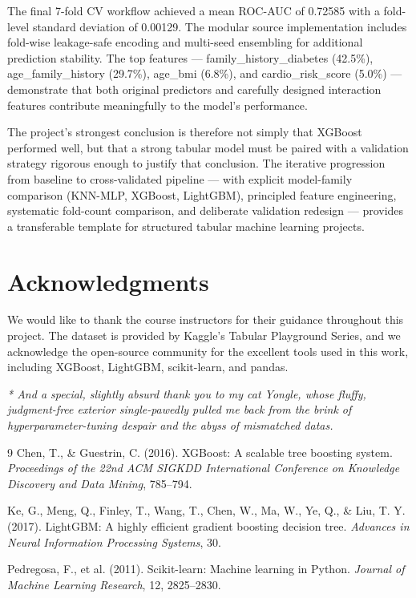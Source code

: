 \documentclass[a4paper,11pt]{article}
\begin{document}
The final 7-fold CV workflow achieved a mean ROC-AUC of 0.72585 with a fold-level standard deviation of 0.00129. The modular source implementation includes fold-wise leakage-safe encoding and multi-seed ensembling for additional prediction stability. The top features --- family\_history\_diabetes (42.5\%), age\_family\_history (29.7\%), age\_bmi (6.8\%), and cardio\_risk\_score (5.0\%) --- demonstrate that both original predictors and carefully designed interaction features contribute meaningfully to the model's performance.

The project's strongest conclusion is therefore not simply that XGBoost performed well, but that a strong tabular model must be paired with a validation strategy rigorous enough to justify that conclusion. The iterative progression from baseline to cross-validated pipeline --- with explicit model-family comparison (KNN-MLP, XGBoost, LightGBM), principled feature engineering, systematic fold-count comparison, and deliberate validation redesign --- provides a transferable template for structured tabular machine learning projects.

\section*{Acknowledgments}

We would like to thank the course instructors for their guidance throughout this project. The dataset is provided by Kaggle's Tabular Playground Series, and we acknowledge the open-source community for the excellent tools used in this work, including XGBoost, LightGBM, scikit-learn, and pandas.

\emph{* And a special, slightly absurd thank you to my cat Yongle, whose fluffy, judgment-free exterior single-pawedly pulled me back from the brink of hyperparameter-tuning despair and the abyss of mismatched datas.}

\begin{thebibliography}{9}
 Chen, T., \& Guestrin, C. (2016). XGBoost: A scalable tree boosting system. \textit{Proceedings of the 22nd ACM SIGKDD International Conference on Knowledge Discovery and Data Mining}, 785--794.

 Ke, G., Meng, Q., Finley, T., Wang, T., Chen, W., Ma, W., Ye, Q., \& Liu, T. Y. (2017). LightGBM: A highly efficient gradient boosting decision tree. \textit{Advances in Neural Information Processing Systems}, 30.

 Pedregosa, F., et al. (2011). Scikit-learn: Machine learning in Python. \textit{Journal of Machine Learning Research}, 12, 2825--2830.
\end{thebibliography}
\end{document}
